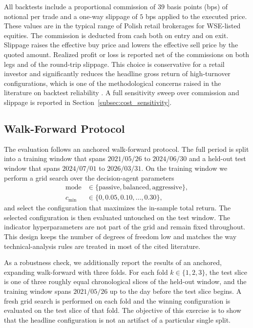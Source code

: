 \documentclass{ieeeaccess}
\begin{document}
All backtests include a proportional commission of $39$ basis points (bps) of notional per trade and a one-way slippage of $5$ bps applied to the executed price. These values are in the typical range of Polish retail brokerages for WSE-listed equities. The commission is deducted from cash both on entry and on exit. Slippage raises the effective buy price and lowers the effective sell price by the quoted amount. Realized profit or loss is reported net of the commissions on both legs and of the round-trip slippage. This choice is conservative for a retail investor and significantly reduces the headline gross return of high-turnover configurations, which is one of the methodological concerns raised in the literature on backtest reliability \cite{bailey2014}. A full sensitivity sweep over commission and slippage is reported in Section~\ref{subsec:cost_sensitivity}.

\subsection{Walk-Forward Protocol}
\label{subsec:walkforward}

The evaluation follows an anchored walk-forward protocol. The full period is split into a training window that spans $2021/05/26$ to $2024/06/30$ and a held-out test window that spans $2024/07/01$ to $2026/03/31$. On the training window we perform a grid search over the decision-agent parameters
\begin{equation}
\begin{aligned}
\mathrm{mode} &\in \{\text{passive}, \text{balanced}, \text{aggressive}\}, \\
c_{\min} &\in \{0, 0.05, 0.10, \ldots, 0.30\},
\end{aligned}
\end{equation}
and select the configuration that maximizes the in-sample total return. The selected configuration is then evaluated untouched on the test window. The indicator hyperparameters are not part of the grid and remain fixed throughout. This design keeps the number of degrees of freedom low and matches the way technical-analysis rules are treated in most of the cited literature.

As a robustness check, we additionally report the results of an anchored, expanding walk-forward with three folds. For each fold $k \in \{1, 2, 3\}$, the test slice is one of three roughly equal chronological slices of the held-out window, and the training window spans $2021/05/26$ up to the day before the test slice begins. A fresh grid search is performed on each fold and the winning configuration is evaluated on the test slice of that fold. The objective of this exercise is to show that the headline configuration is not an artifact of a particular single split.
\end{document}
